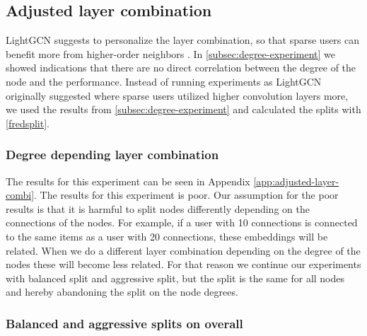 \subsection{Adjusted layer combination}
LightGCN suggests to personalize the layer combination, so that sparse users can benefit more from higher-order neighbors \cite{lightgcn}.
In \autoref{subsec:degree-experiment} we showed indications that there are no direct correlation between the degree of the node and the performance.
Instead of running experiments as LightGCN originally suggested where sparse users utilized higher convolution layers more, we used the results from \autoref{subsec:degree-experiment} and calculated the splits with \autoref{fredsplit}.
\subsubsection{Degree depending layer combination}
The results for this experiment can be seen in Appendix \ref{app:adjusted-layer-combi}.
The results for this experiment is poor.
Our assumption for the poor results is that it is harmful to split nodes differently depending on the connections of the nodes.
For example, if a user with 10 connections is connected to the same items as a user with 20 connections, these embeddings will be related.
When we do a different layer combination depending on the degree of the nodes these will become less related.
For that reason we continue our experiments with balanced split and aggressive split, but the split is the same for all nodes and hereby abandoning the split on the node degrees.

\subsubsection{Balanced and aggressive splits on overall}

